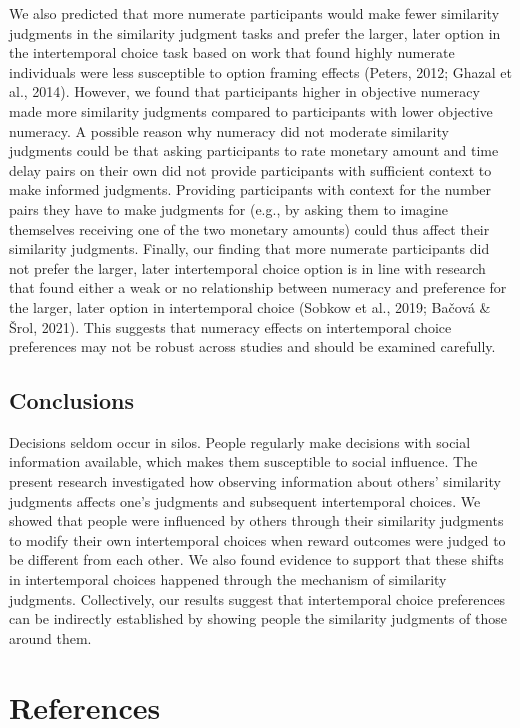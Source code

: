 \documentclass[
  pub,floatsintext]{apa6}
\begin{document}
We also predicted that more numerate participants would make fewer similarity judgments in the similarity judgment tasks and prefer the larger, later option in the intertemporal choice task based on work that found highly numerate individuals were less susceptible to option framing effects (Peters, 2012; Ghazal et al., 2014). However, we found that participants higher in objective numeracy made more similarity judgments compared to participants with lower objective numeracy. A possible reason why numeracy did not moderate similarity judgments could be that asking participants to rate monetary amount and time delay pairs on their own did not provide participants with sufficient context to make informed judgments. Providing participants with context for the number pairs they have to make judgments for (e.g., by asking them to imagine themselves receiving one of the two monetary amounts) could thus affect their similarity judgments. Finally, our finding that more numerate participants did not prefer the larger, later intertemporal choice option is in line with research that found either a weak or no relationship between numeracy and preference for the larger, later option in intertemporal choice (Sobkow et al., 2019; Bačová \& Šrol, 2021). This suggests that numeracy effects on intertemporal choice preferences may not be robust across studies and should be examined carefully.

\hypertarget{conclusions}{%
\subsection{Conclusions}\label{conclusions}}

Decisions seldom occur in silos. People regularly make decisions with social information available, which makes them susceptible to social influence. The present research investigated how observing information about others' similarity judgments affects one's judgments and subsequent intertemporal choices. We showed that people were influenced by others through their similarity judgments to modify their own intertemporal choices when reward outcomes were judged to be different from each other. We also found evidence to support that these shifts in intertemporal choices happened through the mechanism of similarity judgments. Collectively, our results suggest that intertemporal choice preferences can be indirectly established by showing people the similarity judgments of those around them.

\hypertarget{references}{%
\section{References}\label{references}}
\end{document}

